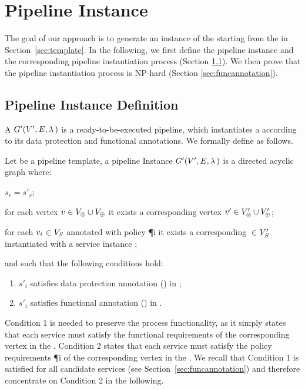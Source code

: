 \section{Pipeline Instance}\label{sec:instance}
The goal of our approach is to generate an instance of the \pipelineTemplate starting from the \pipelineTemplate in Section~\ref{sec:template}. In the following, we first define the pipeline instance and the corresponding pipeline instantiation process (Section \ref{sec:instancedefinition}). We then prove that the pipeline instantiation process is NP-hard (Section \ref{sec:funcannotation}).

\subsection{Pipeline Instance Definition}\label{sec:instancedefinition}
A \pipelineInstance $G'(V',E,\lambda\,)$ is a ready-to-be-executed pipeline, which instantiates a \pipelineTemplate \tChartFunction according to its data protection and functional annotations. We formally define \tChartFunction as follows.

    \begin{definition}\label{def:instance}
      Let \tChartFunction be a pipeline template, a pipeline Instance $G'(V',E,\lambda\,)$ is a directed acyclic graph where:
      \begin{enumerate*}[label=\textit{\roman*})]
        \item $s_r$$=$$s'_r$;
        \item for each vertex $v_{}\in V_{\otimes}\cup V_{\oplus}$ it exists a corresponding vertex $v'_{}\in V'_{\otimes}\cup V'_{\oplus}$;
        \item for each $v_{i}$$\in$$V_S$ annotated with policy \P{i} it exists a corresponding $\in$$V'_S$ instantiated with a service instance ;
      \end{enumerate*}
      and such that the following conditions hold:
      \begin{enumerate}[label=\arabic*)]
        \item $s'_i$ satisfies data protection annotation \myLambda() in \tChartFunction;
        \item $s'_i$ satisfies functional annotation \myGamma() in \tChartFunction.
      \end{enumerate}
    \end{definition}

    Condition 1 is needed to preserve the process functionality, as it simply states that each service  must satisfy the functional requirements  of the corresponding vertex  in the \pipelineTemplate.
    Condition 2 states that each service  must satisfy the policy requirements \P{i} of the corresponding vertex  in the \pipelineTemplate.
    We recall that Condition 1 is satisfied for all candidate services (see Section~\ref{sec:funcannotation}) and therefore concentrate on Condition 2 in the following.

